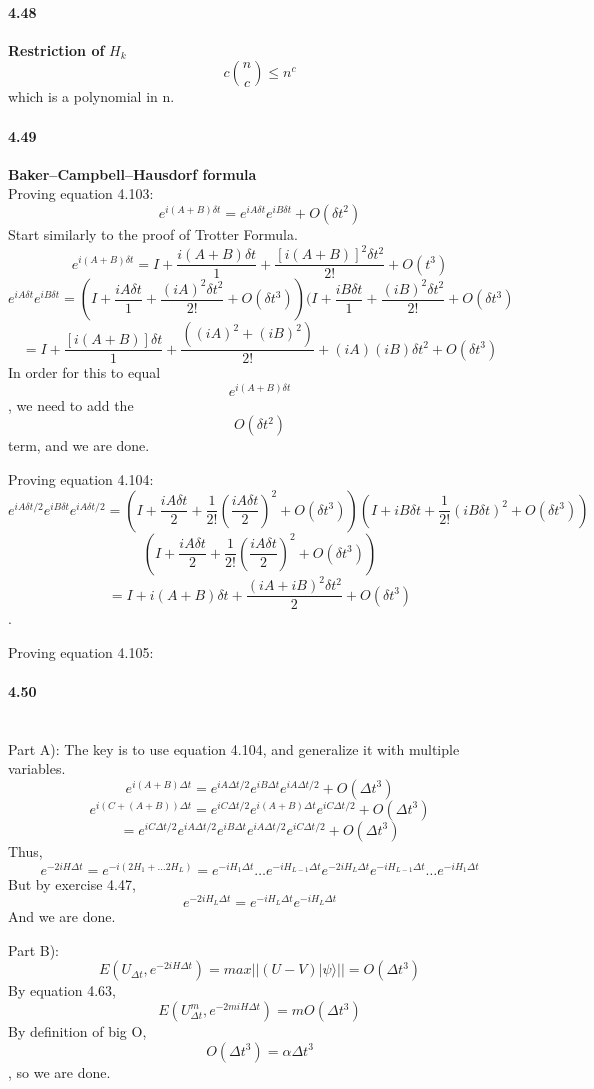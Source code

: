 \paragraph{4.48} \textbf{Restriction of } $H_k$
\\
$$c{n \choose c} \leq n^c$$ which is a polynomial in n. 

\paragraph{4.49} \textbf{Baker–Campbell–Hausdorf formula}
\\
Proving equation 4.103:
$$e^{i(A+B)\delta t} = e^{iA\delta t}e^{iB\delta t} + O(\delta t^2)$$
Start similarly to the proof of Trotter Formula.
$$e^{i(A+B)\delta t} = I + \frac{i(A+B)\delta t}{1} + \frac{[i(A+B)]^2\delta t^2}{2!} + O(t^3)$$
$$e^{iA\delta t}e^{iB\delta t} = (I + \frac{iA\delta t}{1} + \frac{(iA)^2\delta t^2}{2!} + O(\delta t^3) )(I + \frac{iB\delta t}{1} + \frac{(iB)^2\delta t^2}{2!} + O(\delta t^3)$$
$$= I + \frac{[i(A+B)]\delta t}{1} + \frac{((iA)^2 + (iB)^2)}{2!} + (iA)(iB)\delta t^2 + O(\delta t^3)$$
In order for this to equal $$e^{i(A+B)\delta t}$$, we need to add the $$O(\delta t^2)$$ term, and we are done.


Proving equation 4.104:
$$e^{iA\delta t/2}e^{iB\delta t}e^{iA\delta t/2} = \left(I + \frac{iA\delta t}{2} + \frac{1}{2!}\left(\frac{iA\delta t}{2} \right)^2 + O(\delta t^3)\right) \left(I + iB\delta t + \frac{1}{2!}(iB\delta t)^2 + O(\delta t^3)\right)$$ 
$$ \left(I + \frac{iA\delta t}{2} + \frac{1}{2!}\left(\frac{iA\delta t}{2} \right)^2 + O(\delta t^3)\right) $$ 
$$= I + i(A+B)\delta t + \frac{(iA + iB)^2 \delta t^2}{2} + O(\delta t^3)$$.


Proving equation 4.105:

\paragraph{4.50} \textbf{}
\\

Part A):
The key is to use equation 4.104, and generalize it with multiple variables.
$$e^{i(A+B)\Delta t} = e^{iA\Delta t/2}e^{iB\Delta t}e^{iA\Delta t/2} + O(\Delta t^3)$$
$$e^{i(C+(A+B))\Delta t} = e^{iC\Delta t/2}e^{i(A+B)\Delta t}e^{iC\Delta t/2} + O(\Delta t^3)$$
$$= e^{iC\Delta t/2} e^{iA\Delta t/2}e^{iB\Delta t}e^{iA\Delta t/2}e^{iC\Delta t/2} + O(\Delta t^3)$$
Thus,
$$e^{-2iH\Delta t}= e^{-i(2H_1 + \ldots 2H_L)} = e^{-iH_1\Delta t}\ldots e^{-iH_{L-1}\Delta t} e^{-2iH_L \Delta t}e^{-iH_{L-1}\Delta t}\ldots e^{-iH_{1}\Delta t} $$
But by exercise 4.47,
$$e^{-2iH_L \Delta t} = e^{-iH_L\Delta t}e^{-iH_L\Delta t}$$
And we are done. 


Part B):
$$E(U_{\Delta t}, e^{-2iH\Delta t}) = max ||(U-V)|\psi \rangle || = O(\Delta t^3)$$
By equation 4.63, 
$$E(U_{\Delta t}^m, e^{-2miH\Delta t})= mO(\Delta t^3)$$
By definition of big O, $$O(\Delta t^3) = \alpha \Delta t^3$$, so we are done.
